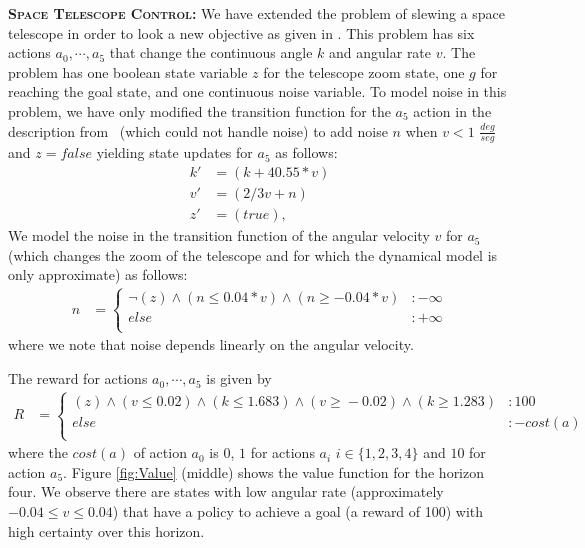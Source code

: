 {\bf \textsc{Space Telescope Control}:} We have extended the problem
of slewing a space telescope in order to look a new objective as given
in \cite{DLohr:2012}. This problem has six actions $a_0, \cdots ,a_5$
that change the continuous angle $k$ and angular rate $v$.  The
problem has one boolean state variable $z$ for the telescope zoom
state, one $g$ for reaching the goal state, and one continuous noise
variable.  To model noise in this problem, we have only modified the
transition function for the $a_5$ action in the description
from~\cite{DLohr:2012} (which could not handle noise) to add noise
$n$ when $v < 1$ $\frac{deg}{seg}$ and $z=false$ yielding state
updates for $a_5$ as follows: {\footnotesize
\begin{align*}
k' & =( k + 40.55*v) \\
v'& =(2/3 v + n) \\
z'& =( true ),
\end{align*}}
We model the noise in the transition function of the angular
velocity $v$ for $a_5$ (which changes the zoom of the telescope and for which
the dynamical model is only approximate) as follows:
{\footnotesize
\begin{align*}
n & = \begin{cases}
\neg (z) \wedge (n \leq 0.04*v) \wedge (n \geq -0.04*v) &:-\infty\\
else &: +\infty\\
\end{cases}
\end{align*}}
where we note that noise depends linearly on the angular velocity.

The reward for actions $a_0, \cdots ,a_5$ is given by
{\tiny
\begin{align*}
R & = \begin{cases}
(z) \wedge (v \! \leq \! 0.02) \wedge (k \! \leq \! 1.683) \wedge (v \! \geq \! -0.02) \wedge (k \! \geq \! 1.283) &\!\!:100\\
else &: -\mathit{cost}(a)\\
\end{cases}
\end{align*}}
where the $\mathit{cost}(a)$ of action $a_0$ is 0, $1$ for actions
$a_i$ $i \in \{1,2,3,4\}$ and $10$ for action $a_5$.  
Figure \ref{fig:Value} (middle) shows the value function for the
horizon four. We observe there are states with low angular
rate (approximately $-0.04\leq v \leq 0.04$) that have a policy to
achieve a goal (a reward of 100) with high certainty over this
horizon.

